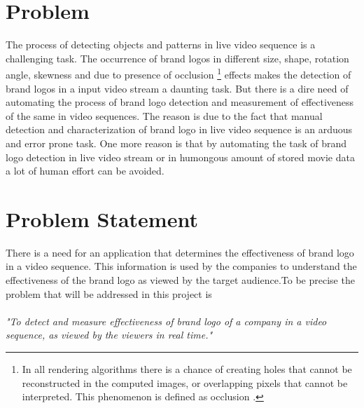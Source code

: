 \section{Problem}
The process of detecting objects and patterns in live video sequence is a challenging task. The occurrence of brand logos in different size, shape, rotation angle, skewness and due to presence of occlusion \footnote{In all rendering algorithms there is a chance of creating holes that cannot be reconstructed in the computed images, or overlapping pixels that cannot be interpreted. This phenomenon is defined as occlusion \cite{Depth6:online}.} effects makes the detection of brand logos in a input video stream a daunting task. But there is a dire need of automating the process of brand logo detection and measurement of effectiveness of the same in video sequences. The reason is due to the fact that manual detection and characterization of brand logo in live video sequence is an arduous and error prone task. One more reason is that by automating the task of brand logo detection in live video stream or in humongous amount of stored movie data a lot of human effort can be avoided.  


\section{Problem Statement}
  There is a need for an application that determines the effectiveness of brand logo in a video sequence. This information is used by the companies to understand the effectiveness of the brand logo as viewed by the target audience.To be precise the problem that will be addressed in this project is \\ \\ 
  {\it "To detect and measure effectiveness of brand logo of a company in a video sequence, as viewed by the viewers in real time."} 
